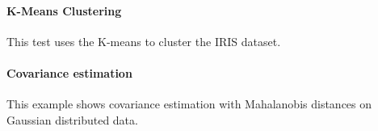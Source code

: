 \documentclass[11pt]{article}
\begin{document}


\paragraph{K-Means Clustering}

This test uses the K-means to cluster the IRIS dataset.


\paragraph{Covariance estimation}

This example shows covariance estimation with Mahalanobis distances on Gaussian distributed data.



\end{document}
